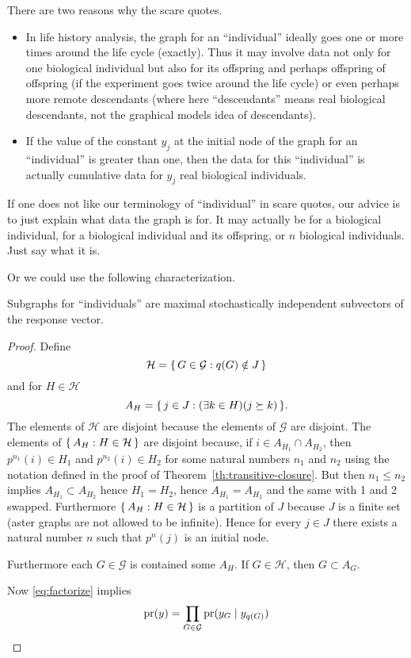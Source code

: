 There are two reasons why the scare quotes.
\begin{itemize}
\item In life history
analysis, the graph for an ``individual'' ideally goes one or more times
around the life cycle (exactly).  Thus it may involve data not only for
one biological individual but also for its offspring and perhaps offspring
of offspring (if the experiment goes twice around the life cycle) or even
perhaps more remote descendants (where here ``descendants'' means real
biological descendants, not the graphical models idea of descendants).
\item If the value of the constant $y_j$ at the initial node of the
graph for an ``individual'' is greater than one, then the data for this
``individual'' is actually cumulative data for $y_j$ real biological
individuals.
\end{itemize}


If one does not like our terminology of ``individual'' in scare quotes,
our advice is to just explain what data the graph is for.  It may actually
be for a biological individual, for a biological individual
and its offspring, or $n$ biological individuals.  Just say what it is.

Or we could use the following characterization.
\begin{theorem}
Subgraphs for ``individuals'' are maximal stochastically independent
subvectors of the response vector.
\end{theorem}
\begin{proof}
Define
$$
   \mathcal{H} = \{\,  G \in \mathcal{G} : q(G) \notin J  \,\}
$$
and for $H \in \mathcal{H}$
$$
   A_H = \{\,  j \in J : (\exists k \in H)(j \succeq k)  \,\}.
$$
The elements of $\mathcal{H}$ are disjoint because the elements of
$\mathcal{G}$ are disjoint.
The elements of $\{\, A_H : H \in \mathcal{H} \,\}$ are disjoint
because, if $i \in A_{H_1} \cap A_{H_2}$, then $p^{n_1}(i) \in H_1$
and $p^{n_2}(i) \in H_2$ for some natural numbers $n_1$ and $n_2$
using the notation defined in the proof of Theorem~\ref{th:transitive-closure}.
But then $n_1 \le n_2$ implies $A_{H_1} \subset A_{H_2}$ hence $H_1 = H_2$,
hence $A_{H_1} = A_{H_2}$ and the same with 1 and 2 swapped.
Furthermore $\{\, A_H : H \in \mathcal{H} \,\}$ is a partition of $J$ because
$J$ is a finite set (aster graphs are not allowed to be infinite).
Hence for every $j \in J$ there exists a natural number $n$ such that
$p^n(j)$ is an initial node.


Furthermore each $G \in \mathcal{G}$ is contained some $A_H$.
If $G \in \mathcal{H}$, then $G \subset A_G$.

Now \eqref{eq:factorize} implies
$$
   \operatorname{pr}(y)
   =
   \prod_{G \in \mathcal{G}} \operatorname{pr}(y_G \mid y_{q(G)})
$$
\end{proof}


